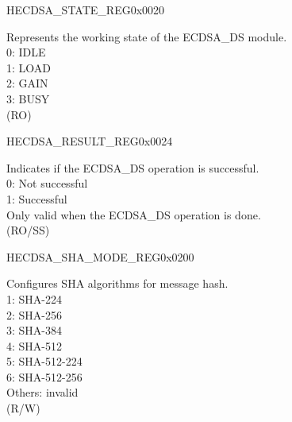 \begin{register}{H}{ECDSA\_STATE\_REG}{0x0020}\label{regdesc:ECDSASTATEREG}
%
%
\regnewline%
\begin{regdesc}\begin{reglist}
\label{fielddesc:ECDSABUSY}\item [ECDSA\_BUSY] Represents the working state of the ECDSA\_DS module.\\
0: IDLE\\
1: LOAD\\
2: GAIN\\
3: BUSY\\
(RO)
\end{reglist}\end{regdesc}
\end{register}


\begin{register}{H}{ECDSA\_RESULT\_REG}{0x0024}\label{regdesc:ECDSARESULTREG}
%
%
\regnewline%
\begin{regdesc}\begin{reglist}
\label{fielddesc:ECDSAOPERATIONRESULT}\item [ECDSA\_OPERATION\_RESULT] Indicates if the ECDSA\_DS operation is successful.\\
0: Not successful\\
1: Successful\\
Only valid when the ECDSA\_DS operation is done. \\
(RO/SS)
\end{reglist}\end{regdesc}
\end{register}


\begin{register}{H}{ECDSA\_SHA\_MODE\_REG}{0x0200}\label{regdesc:ECDSASHAMODEREG}
%
%
\regnewline%
\begin{regdesc}\begin{reglist}
\label{fielddesc:ECDSASHAMODE}\item [ECDSA\_SHA\_MODE] Configures SHA algorithms for message hash. \\
1: SHA-224\\
2: SHA-256\\
3: SHA-384\\
4: SHA-512\\
5: SHA-512-224\\
6: SHA-512-256\\
Others: invalid\\
(R/W)
\end{reglist}\end{regdesc}
\end{register}


